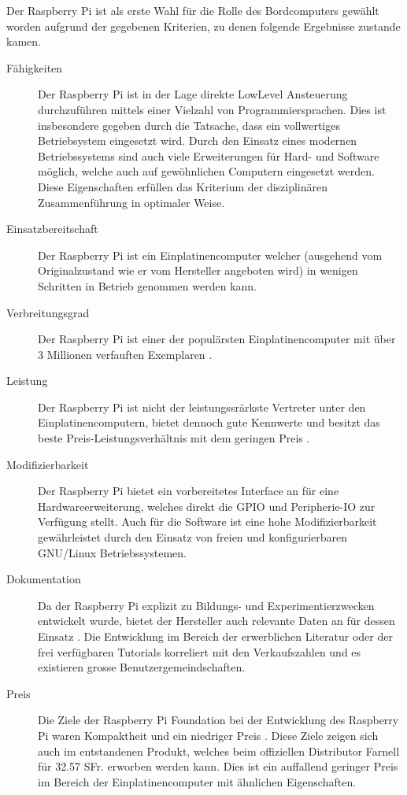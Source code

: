 Der Raspberry Pi ist als erste Wahl für die Rolle des Bordcomputers 
gewählt worden aufgrund der gegebenen Kriterien, zu denen folgende 
Ergebnisse zustande kamen.

\begin{description}
	\item[Fähigkeiten] Der Raspberry Pi ist in der Lage direkte
		LowLevel Ansteuerung durchzuführen mittels einer Vielzahl
		von Programmiersprachen. Dies ist insbesondere gegeben
		durch die Tatsache, dass ein vollwertiges Betriebsystem
		eingesetzt wird. Durch den Einsatz eines modernen
		Betriebssystems sind auch viele Erweiterungen für Hard- 
		und Software möglich, welche auch auf gewöhnlichen 
		Computern eingesetzt werden. Diese Eigenschaften erfüllen
		das Kriterium der disziplinären Zusammenführung in 
		optimaler Weise.
	\item[Einsatzbereitschaft] Der Raspberry Pi ist ein 
		Einplatinencomputer welcher (ausgehend vom Originalzustand
		wie er vom Hersteller angeboten wird) in wenigen Schritten 
		in Betrieb genommen werden kann. 
	\item[Verbreitungsgrad] Der Raspberry Pi ist einer der
		populärsten Einplatinencomputer mit über 3 Millionen
		verfauften Exemplaren \cite{liz}.
	\item[Leistung] Der Raspberry Pi ist nicht der leistungssrärkste
		Vertreter unter den Einplatinencomputern, bietet dennoch
		gute Kennwerte und besitzt das beste
		Preis-Leistungsverhältnis mit dem geringen Preis \cite{elv}.
	\item[Modifizierbarkeit] Der Raspberry Pi bietet ein vorbereitetes
		Interface an für eine Hardwareerweiterung, welches direkt
		die GPIO und Peripherie-IO zur Verfügung stellt. Auch
		für die Software ist eine hohe Modifizierbarkeit 
		gewährleistet durch den Einsatz von freien und 
		konfigurierbaren GNU/Linux Betriebssystemen.
	\item[Dokumentation] Da der Raspberry Pi explizit zu 
		Bildungs- und Experimentierzwecken entwickelt wurde, 
		bietet der Hersteller auch relevante Daten an für dessen
		Einsatz \cite{RPiSchematics}. Die Entwicklung im Bereich der
		erwerblichen Literatur oder der frei verfügbaren
		Tutorials korreliert mit den Verkaufszahlen und es 
		existieren grosse Benutzergemeindschaften.
	\item[Preis] Die Ziele der Raspberry Pi Foundation bei der
		Entwicklung des Raspberry Pi waren Kompaktheit und ein 
		niedriger Preis \cite{RPiFoundation}. Diese Ziele zeigen sich
		auch im entstandenen Produkt, welches beim offiziellen 
		Distributor Farnell für 32.57 SFr. erworben werden kann. Dies 
		ist ein auffallend geringer Preis im Bereich der 
		Einplatinencomputer mit ähnlichen Eigenschaften.
\end{description}

